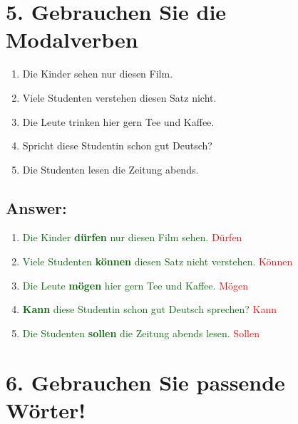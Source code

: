 \documentclass[12pt]{article}
\begin{document}
\vspace{1em}

\section*{5. Gebrauchen Sie die Modalverben}

\begin{enumerate}
\item Die Kinder sehen nur diesen Film.
\item Viele Studenten verstehen diesen Satz nicht.
\item Die Leute trinken hier gern Tee und Kaffee.
\item Spricht diese Studentin schon gut Deutsch?
\item Die Studenten lesen die Zeitung abends.
\end{enumerate}

\subsection*{Answer:}
\begin{enumerate}
    \item \textcolor{darkgreen}{Die Kinder \textbf{dürfen} nur diesen Film sehen.} \textcolor{red}{Dürfen}
    \item \textcolor{darkgreen}{Viele Studenten \textbf{können} diesen Satz nicht verstehen.} \textcolor{red}{Können}
    \item \textcolor{darkgreen}{Die Leute \textbf{mögen} hier gern Tee und Kaffee.} \textcolor{red}{Mögen}
    \item \textcolor{darkgreen}{\textbf{Kann} diese Studentin schon gut Deutsch sprechen?} \textcolor{red}{Kann}
    \item \textcolor{darkgreen}{Die Studenten \textbf{sollen} die Zeitung abends lesen.} \textcolor{red}{Sollen}
    \end{enumerate}
\vspace{1em}

\section*{6. Gebrauchen Sie passende Wörter!}
\end{document}
